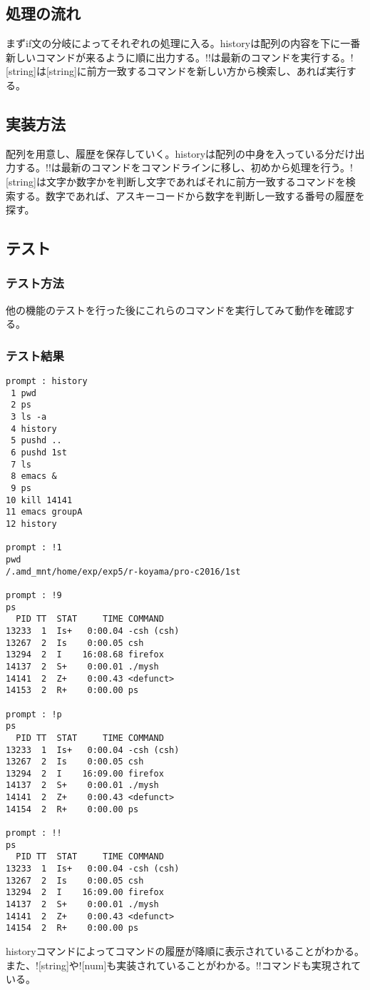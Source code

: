 \documentclass{procreport}
\begin{document}
\subsection{処理の流れ}
まずif文の分岐によってそれぞれの処理に入る。historyは配列の内容を下に一番新しいコマンドが来るように順に出力する。!!は最新のコマンドを実行する。![string]は[string]に前方一致するコマンドを新しい方から検索し、あれば実行する。
\subsection{実装方法}
配列を用意し、履歴を保存していく。historyは配列の中身を入っている分だけ出力する。!!は最新のコマンドをコマンドラインに移し、初めから処理を行う。![string]は文字か数字かを判断し文字であればそれに前方一致するコマンドを検索する。数字であれば、アスキーコードから数字を判断し一致する番号の履歴を探す。
\subsection{テスト}
\subsubsection{テスト方法}
他の機能のテストを行った後にこれらのコマンドを実行してみて動作を確認する。
\subsubsection{テスト結果}
\begin{screen}
\begin{verbatim}
prompt : history
 1 pwd
 2 ps
 3 ls -a
 4 history
 5 pushd ..
 6 pushd 1st
 7 ls
 8 emacs &
 9 ps
10 kill 14141
11 emacs groupA
12 history

prompt : !1
pwd
/.amd_mnt/home/exp/exp5/r-koyama/pro-c2016/1st

prompt : !9
ps
  PID TT  STAT     TIME COMMAND
13233  1  Is+   0:00.04 -csh (csh)
13267  2  Is    0:00.05 csh
13294  2  I    16:08.68 firefox
14137  2  S+    0:00.01 ./mysh
14141  2  Z+    0:00.43 <defunct>
14153  2  R+    0:00.00 ps

prompt : !p
ps
  PID TT  STAT     TIME COMMAND
13233  1  Is+   0:00.04 -csh (csh)
13267  2  Is    0:00.05 csh
13294  2  I    16:09.00 firefox
14137  2  S+    0:00.01 ./mysh
14141  2  Z+    0:00.43 <defunct>
14154  2  R+    0:00.00 ps

prompt : !!
ps
  PID TT  STAT     TIME COMMAND
13233  1  Is+   0:00.04 -csh (csh)
13267  2  Is    0:00.05 csh
13294  2  I    16:09.00 firefox
14137  2  S+    0:00.01 ./mysh
14141  2  Z+    0:00.43 <defunct>
14154  2  R+    0:00.00 ps

\end{verbatim}
\end{screen}
historyコマンドによってコマンドの履歴が降順に表示されていることがわかる。また、![string]や![num]も実装されていることがわかる。!!コマンドも実現されている。
\end{document}
